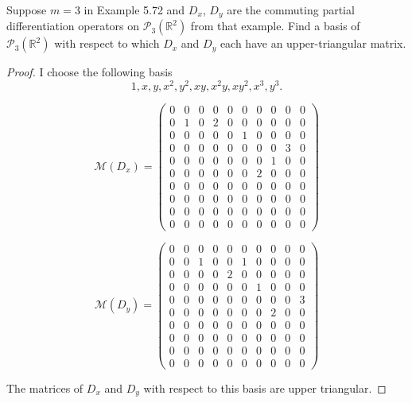 \begin{exercise}
    Suppose $m = 3$ in Example 5.72 and $D_{x}$, $D_{y}$ are the commuting partial
    differentiation operators on $\mathscr{P}_{3}(\mathbb{R}^{2})$ from that example. Find a basis of $\mathscr{P}_{3}(\mathbb{R}^{2})$ with respect to which $D_{x}$ and $D_{y}$ each have an upper-triangular matrix.
\end{exercise}

\begin{proof}
    I choose the following basis
    \[
        1, x, y, x^{2}, y^{2}, xy, x^{2}y, xy^{2}, x^{3}, y^{3}.
    \]

    \[
        \mathcal{M}(D_{x}) = \begin{pmatrix}
            0 & 0 & 0 & 0 & 0 & 0 & 0 & 0 & 0 & 0 \\
            0 & 1 & 0 & 2 & 0 & 0 & 0 & 0 & 0 & 0 \\
            0 & 0 & 0 & 0 & 0 & 1 & 0 & 0 & 0 & 0 \\
            0 & 0 & 0 & 0 & 0 & 0 & 0 & 0 & 3 & 0 \\
            0 & 0 & 0 & 0 & 0 & 0 & 0 & 1 & 0 & 0 \\
            0 & 0 & 0 & 0 & 0 & 0 & 2 & 0 & 0 & 0 \\
            0 & 0 & 0 & 0 & 0 & 0 & 0 & 0 & 0 & 0 \\
            0 & 0 & 0 & 0 & 0 & 0 & 0 & 0 & 0 & 0 \\
            0 & 0 & 0 & 0 & 0 & 0 & 0 & 0 & 0 & 0 \\
            0 & 0 & 0 & 0 & 0 & 0 & 0 & 0 & 0 & 0
        \end{pmatrix}
    \]

    \[
        \mathcal{M}(D_{y}) = \begin{pmatrix}
            0 & 0 & 0 & 0 & 0 & 0 & 0 & 0 & 0 & 0 \\
            0 & 0 & 1 & 0 & 0 & 1 & 0 & 0 & 0 & 0 \\
            0 & 0 & 0 & 0 & 2 & 0 & 0 & 0 & 0 & 0 \\
            0 & 0 & 0 & 0 & 0 & 0 & 1 & 0 & 0 & 0 \\
            0 & 0 & 0 & 0 & 0 & 0 & 0 & 0 & 0 & 3 \\
            0 & 0 & 0 & 0 & 0 & 0 & 0 & 2 & 0 & 0 \\
            0 & 0 & 0 & 0 & 0 & 0 & 0 & 0 & 0 & 0 \\
            0 & 0 & 0 & 0 & 0 & 0 & 0 & 0 & 0 & 0 \\
            0 & 0 & 0 & 0 & 0 & 0 & 0 & 0 & 0 & 0 \\
            0 & 0 & 0 & 0 & 0 & 0 & 0 & 0 & 0 & 0
        \end{pmatrix}
    \]

    The matrices of $D_{x}$ and $D_{y}$ with respect to this basis are upper triangular.
\end{proof}
\newpage

